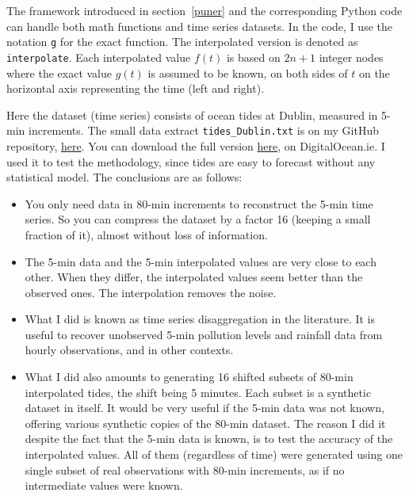 \documentclass[oneside,10pt]{book}
\begin{document}
The framework introduced in section~\ref{puner} and the corresponding Python code can handle both math functions and time series datasets. In the code, I use the notation \texttt{g} for the exact function. The interpolated version
is denoted as \texttt{interpolate}. Each interpolated value $f(t)$ is based on $2n+1$ integer nodes where the exact value $g(t)$ is assumed to be known, on both sides of $t$ on the horizontal axis representing the time (left and right).

Here the dataset (time series) consists of ocean tides at Dublin, measured in 5-min increments. The small data extract
 \texttt{tides\_Dublin.txt} is on my GitHub repository, \href{https://github.com/VincentGranville/Statistical-Optimization/blob/main/tides_Dublin.txt}{here}. You can download the full version \href{https://www.digitalocean.ie/Data/DownloadTideData}{here},
 on DigitalOcean.ie. I used it to test the methodology, since tides are easy to forecast without any statistical model.
The conclusions are as follows: \vspace{1ex}
\begin{itemize}
\item You only need data in 80-min increments to reconstruct the 5-min time series. So you can compress the dataset by a factor 16 (keeping a small fraction of it), almost without loss of information.
\item The 5-min data and the 5-min interpolated values are very close to each other. When they differ, the interpolated values seem better than the observed ones. The interpolation removes the noise.
\item What I did is known as time series \textcolor{index}{disaggregation} in the literature. It is useful to recover unobserved 5-min pollution levels and rainfall data from hourly observations, and in other contexts.
\item What I did also amounts to generating 16 shifted subsets of 80-min interpolated tides, the shift being 5 minutes.
Each subset is a synthetic dataset in itself. It would be very useful if the 5-min data was not known, offering various synthetic copies
 of the 80-min dataset.  The reason I did it despite the fact that the 5-min data is known, is to test the accuracy of the interpolated values. All of them (regardless of time) were generated using one single subset of real observations with 80-min increments, as if no intermediate values were known.
\end{itemize} \vspace{1ex}
\end{document}
